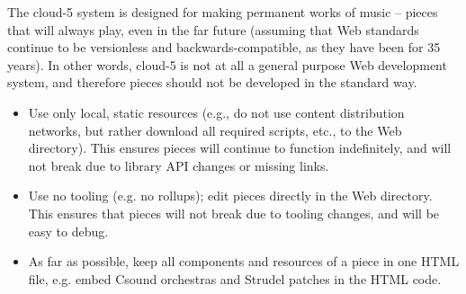 \documentclass[runningheads,a4paper]{llncs}
\begin{document}
The cloud-5 system is designed for making permanent works of music -- pieces that will always play, even in the far future (assuming that Web standards continue to be versionless and backwards-compatible, as they have been for 35 years). In other words, cloud-5 is not at all a general purpose Web development system, and therefore pieces should not be developed in the standard way.

\begin{itemize}
\item Use only local, static resources (e.g., do not use content distribution networks, but rather download all required scripts, etc., to the Web directory). This ensures pieces will continue to function indefinitely, and will not break due to library API changes or missing links.
\item Use no tooling (e.g. no rollups); edit pieces directly in the Web directory. This ensures that pieces will not break due to tooling changes, and will be easy to debug.
\item As far as possible, keep all components and resources of a piece in one HTML file, e.g. embed Csound orchestras and Strudel patches in the HTML code.
\end{itemize}
\end{document}
